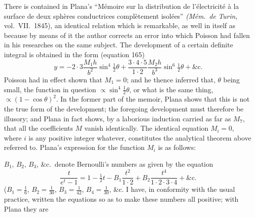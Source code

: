 \documentclass[11pt,a4paper]{article}
\begin{document}
There is contained in Plana's ``Mémoire sur la distribution de l'électricité à la surface de deux sphères conductrices complètement isolées'' \textit{(Mém.\ de Turin}, vol.~VII.\ 1845), an identical relation which is remarkable, as well in itself as because by means of it the author corrects an error into which Poisson had fallen in his researches on the same subject. The development of a certain definite integral is obtained in the form (equation 165)
\[
y = -2 \cdot 3 \frac{M_{1} h}{b^{2}} \sin^{4}\tfrac{1}{2}\theta + \frac{3 \cdot 4 \cdot 5}{1 \cdot 2}\frac{M_{2} h}{b^{3}} \sin^{6}\tfrac{1}{2}\theta + \&\mathrm{c}.
\]
Poisson had in effect shown that $M_{1} = 0$; and he thence inferred that, $\theta$ being small, the function in question $\propto \sin^{4}\tfrac{1}{2}\theta$, or what is the same thing, $\propto (1 - \cos\theta)^{2}$. In the former part of the memoir, Plana shows that this is not the true form of the development; the foregoing development must therefore be illusory; and Plana in fact shows, by a laborious induction carried as far as $M_{7}$, that all the coefficients $M$ vanish identically. The identical equation $M_{i} = 0$, where $i$ is any positive integer whatever, constitutes the analytical theorem above referred to. Plana's expression for the function $M_{i}$ is as follows:

$B_{1}$, $B_{2}$, $B_{3}$, \&c.\ denote Bernoulli's numbers as given by the equation
\[
\frac{t}{e^{t} - 1} = 1 - \tfrac{1}{2} t - B_{1}\frac{t^{2}}{1 \cdot 2} + B_{2}\frac{t^{4}}{1 \cdot 2 \cdot 3 \cdot 4} + \&\mathrm{c}.
\]
($B_{1} = \tfrac{1}{6}$, $B_{2} = \tfrac{1}{30}$, $B_{3} = \tfrac{1}{42}$, $B_{4} = \tfrac{1}{30}$, \&c. I have, in conformity with the usual practice, written the equations so as to make these numbers all positive; with Plana they are

\setcounter{page}{93}
\end{document}
